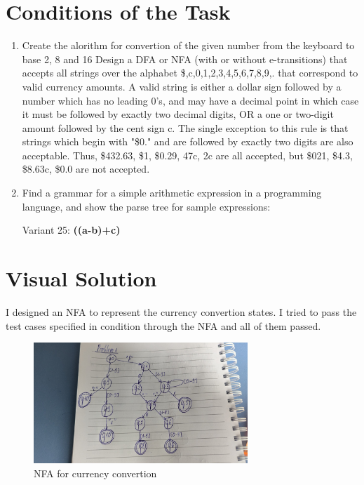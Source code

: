 \documentclass[12pt]{article}
\begin{document}
\section*{Conditions of the Task}
\begin{enumerate}
    \item Create the alorithm for convertion of the given number from the keyboard to base 2, 8 and 16
Design a DFA or NFA (with or without e-transitions) that accepts all strings over the 
alphabet {\$,c,0,1,2,3,4,5,6,7,8,9,.} that correspond to valid currency amounts. A valid 
string is either a dollar sign followed by a number which has no leading 0's, and may have a 
decimal point in which case it must be followed by exactly two decimal digits, OR a one or two-digit amount 
followed by the cent sign c. The single exception to this rule is that strings which begin with "\$0." 
and are followed by exactly two digits are also acceptable. Thus, \$432.63, \$1, \$0.29, 47c, 2c are all 
accepted, but \$021, \$4.3, \$8.63c, \$0.0 are not accepted. 
    \item Find a grammar for a simple arithmetic expression in a 
      programming language, and show the 
      parse tree for sample expressions:

      Variant 25: \textbf{((a-b)+c)}
\end{enumerate}

\section*{Visual Solution}
\hspace{0.8cm}

I designed an NFA to represent the currency convertion
states. I tried to pass the test cases specified in condition through the NFA
and all of them passed.

\begin{figure}[!h]
\begin{center}
\includegraphics[width=0.72\textwidth]
{problem1.jpg}
\end{center}
\caption{NFA for currency convertion}
\label{fig:pic1}
\end{figure}
\end{document}
